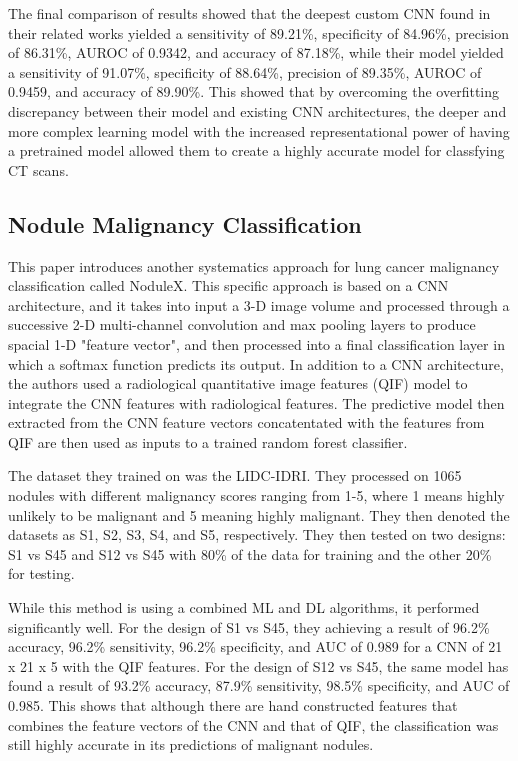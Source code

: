 \documentclass[10pt,twocolumn,letterpaper]{article}
\begin{document}
      The final comparison of results showed that the deepest custom CNN found in their related works yielded a sensitivity of
      89.21\%, specificity of 84.96\%, precision of 86.31\%, AUROC of 0.9342, and accuracy of 87.18\%, while their model
      yielded a sensitivity of 91.07\%, specificity of 88.64\%, precision of 89.35\%, AUROC of 0.9459, and accuracy of 89.90\%.
      This showed that by overcoming the overfitting discrepancy between their model and existing CNN architectures, the
      deeper and more complex learning model with the increased representational power of having a pretrained model
      allowed them to create a highly accurate model for classfying CT scans.

   \subsection{Nodule Malignancy Classification} \label{sec:related-nodulex}
      This paper \cite{nodulex} introduces another systematics approach for lung cancer malignancy classification called
      NoduleX. This specific approach is based on a CNN architecture, and it takes into input a 3-D image volume and processed
      through a successive 2-D multi-channel convolution and max pooling layers to produce spacial 1-D "feature vector",
      and then processed into a final classification layer in which a softmax function predicts its output. In addition
      to a CNN architecture, the authors used a radiological quantitative image features (QIF) model to integrate
      the CNN features with radiological features. The predictive model then extracted from the CNN feature vectors concatentated
      with the features from QIF are then used as inputs to a trained random forest classifier.

      The dataset they trained on was the LIDC-IDRI. They processed on 1065 nodules with different malignancy scores ranging
      from 1-5, where 1 means highly unlikely to be malignant and 5 meaning highly malignant. They then denoted the datasets as
      S1, S2, S3, S4, and S5, respectively. They then tested on two designs: S1 vs S45 and S12 vs S45 with 80\% of the data
      for training and the other 20\% for testing.

      While this method is using a combined ML and DL algorithms, it performed significantly well. For the design of S1 vs S45,
      they achieving a result of 96.2\% accuracy, 96.2\% sensitivity, 96.2\% specificity, and AUC of 0.989 for a CNN of 21 x 21 x 5 with the QIF
      features. For the design of S12 vs S45, the same model has found a result of 93.2\% accuracy, 87.9\% sensitivity, 98.5\% specificity, and AUC of 0.985.
      This shows that although there are hand constructed features that combines the feature vectors of the CNN and that of QIF,
      the classification was still highly accurate in its predictions of malignant nodules.
\end{document}

